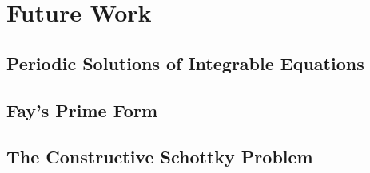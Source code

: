 
\section{Future Work}

\subsection{Periodic Solutions of Integrable Equations}

\subsection{Fay's Prime Form}

\subsection{The Constructive Schottky Problem}

